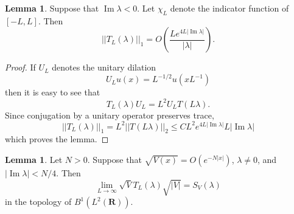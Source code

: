 \documentclass[12pt]{report}
\newcommand{\RR}{\mathbf{R}}
\renewcommand{\Im}{\operatorname{Im}}
\theoremstyle{definition}
\newtheorem{lemma}[theorem]{Lemma}
\begin{document}
\begin{lemma}
\label{estimate on TL}
Suppose that $\Im \lambda < 0$. Let $\chi_L$ denote the indicator function of $[-L, L]$. Then
$$||T_L(\lambda)||_1 = O\left(\frac{Le^{4L|\Im \lambda|}}{|\lambda|}\right).$$
\end{lemma}
\begin{proof}
If $U_L$ denotes the unitary dilation
$$U_Lu(x) = L^{-1/2}u(xL^{-1})$$
then it is easy to see that
$$T_L(\lambda)U_L = L^2U_LT(L\lambda).$$
Since conjugation by a unitary operator preserves trace,
$$||T_L(\lambda)||_1 = L^2 ||T(L\lambda)||_2 \leq CL^2 e^{4L|\Im \lambda|}{L|\Im \lambda|}$$
which proves the lemma.
\end{proof}


\begin{lemma}
\label{convergence in b1 topology}
Let $N > 0$. Suppose that $\sqrt{V(x)} = O(e^{-N|x|})$, $\lambda \neq 0$, and $|\Im \lambda| < N/4$. Then
$$\lim_{L \to \infty} \sqrt V T_L(\lambda) \sqrt{|V|} = S_V(\lambda)$$
in the topology of $B^1(L^2(\RR))$.
\end{lemma}
\end{document}
